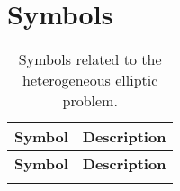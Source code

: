\pagestyle{empty}

\section*{Symbols}
\begin{longtable}{c p{10cm}}
    \caption{Symbols related to the heterogeneous elliptic problem.}\label{tab:elliptic_symbols}            \\
    \hline
    \textbf{Symbol}        & \textbf{Description}                                                           \\
    \hline
    \endfirsthead

    \hline
    \textbf{Symbol}        & \textbf{Description}                                                           \\
    \hline
    \endhead

    \hline
    \endfoot

    \hline
    \endlastfoot


\end{longtable}
